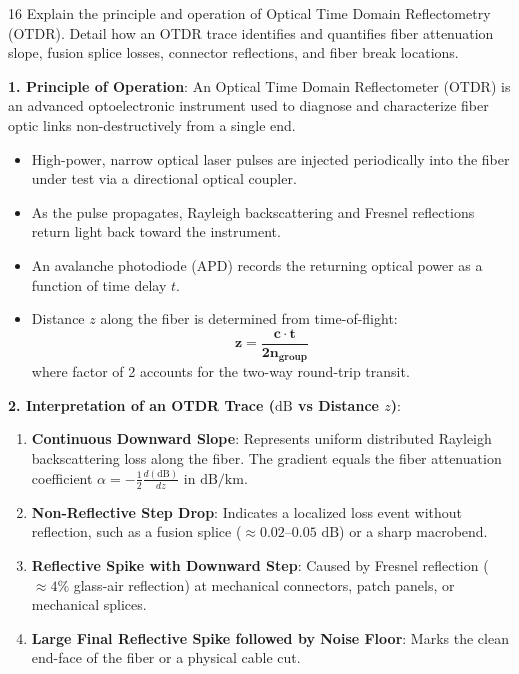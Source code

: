 \begin{theoryq}{16}
Explain the principle and operation of Optical Time Domain Reflectometry (OTDR). Detail how an OTDR trace identifies and quantifies fiber attenuation slope, fusion splice losses, connector reflections, and fiber break locations.
\end{theoryq}
\begin{theorysol}
\textbf{1. Principle of Operation}:
An Optical Time Domain Reflectometer (OTDR) is an advanced optoelectronic instrument used to diagnose and characterize fiber optic links non-destructively from a single end.
\begin{itemize}
    \item High-power, narrow optical laser pulses are injected periodically into the fiber under test via a directional optical coupler.
    \item As the pulse propagates, Rayleigh backscattering and Fresnel reflections return light back toward the instrument.
    \item An avalanche photodiode (APD) records the returning optical power as a function of time delay $t$.
    \item Distance $z$ along the fiber is determined from time-of-flight:
    \begin{equation}
    \mathbf{z = \frac{c \cdot t}{2 n_{\text{group}}}}
    \end{equation}
    where factor of 2 accounts for the two-way round-trip transit.
\end{itemize}

\textbf{2. Interpretation of an OTDR Trace ($\text{dB}$ vs Distance $z$)}:
\begin{enumerate}
    \item \textbf{Continuous Downward Slope}: Represents uniform distributed Rayleigh backscattering loss along the fiber. The gradient equals the fiber attenuation coefficient $\alpha = -\frac{1}{2}\frac{d(\text{dB})}{dz}$ in $\text{dB/km}$.
    \item \textbf{Non-Reflective Step Drop}: Indicates a localized loss event without reflection, such as a fusion splice ($\approx 0.02\text{--}0.05\text{ dB}$) or a sharp macrobend.
    \item \textbf{Reflective Spike with Downward Step}: Caused by Fresnel reflection ($\approx 4\%$ glass-air reflection) at mechanical connectors, patch panels, or mechanical splices.
    \item \textbf{Large Final Reflective Spike followed by Noise Floor}: Marks the clean end-face of the fiber or a physical cable cut.
\end{enumerate}
\end{theorysol}
\vspace{4mm}

